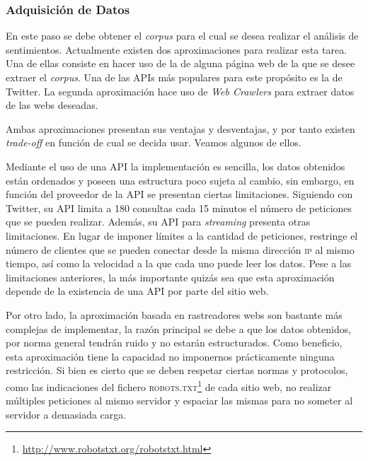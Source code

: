 \subsubsection{Adquisición de Datos}
\label{sec:dataacq}

En este paso se debe obtener el \emph{corpus} para el cual se desea realizar el
análisis de sentimientos. Actualmente existen dos aproximaciones para realizar
esta tarea. Una de ellas consiste en hacer uso de la  de
alguna página web de la que se desee extraer el \emph{corpus}. Una de las
\acp{API} más populares para este propósito es la de Twitter. La segunda
aproximación hace uso de \emph{Web Crawlers} para
extraer datos de las webs deseadas.

Ambas aproximaciones presentan sus ventajas y desventajas, y por tanto existen
\emph{trade-off} en función de cual se decida usar. Veamos algunos de
ellos.

Mediante el uso de una \ac{API} la implementación es sencilla, los datos
obtenidos están ordenados y poseen una estructura poco sujeta al cambio, sin
embargo, en función del proveedor de la \ac{API} se presentan ciertas
limitaciones. Siguiendo con Twitter, su \ac{API} limita a 180 consultas cada 15
minutos el número de peticiones que se pueden realizar. Además, su \ac{API} para
\emph{streaming} presenta otras limitaciones. En lugar de imponer límites a la
cantidad de peticiones, restringe el número de clientes que se pueden conectar
desde la misma dirección \textsc{ip} al mismo tiempo, así como la velocidad a la
que cada uno puede leer los datos. Pese a las limitaciones anteriores, la más
importante quizás sea que esta aproximación depende de la existencia de una
\ac{API} por parte del sitio web.

Por otro lado, la aproximación basada en rastreadores webs son bastante más
complejas de implementar, la razón principal se debe a que los datos obtenidos,
por norma general tendrán ruido y no estarán estructurados. Como beneficio, esta
aproximación tiene la capacidad no imponernos prácticamente ninguna
restricción. Si bien es cierto que se deben respetar ciertas normas y
protocolos, como las indicaciones del fichero
\textsc{robots.txt}\footnote{\url{http://www.robotstxt.org/robotstxt.html}} de
cada sitio web, no realizar múltiples peticiones al mismo servidor y espaciar
las mismas para no someter al servidor a demasiada carga.

